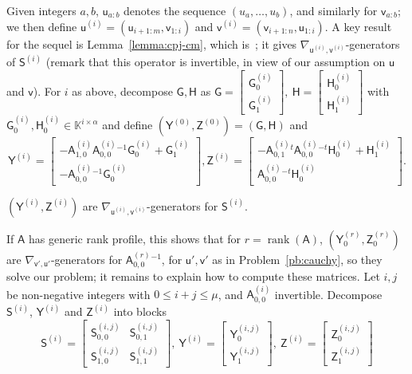 \documentclass[sigconf]{acmart}
\newcommand{\vu}{\ensuremath{\mathsf{u}}}
\newcommand{\vv}{\ensuremath{\mathsf{v}}}
\newcommand{\mA}{\ensuremath{\mathsf{A}}}
\newcommand{\mG}{\ensuremath{\mathsf{G}}}
\newcommand{\mH}{\ensuremath{\mathsf{H}}}
\newcommand{\mS}{\ensuremath{\mathsf{S}}}
\newcommand{\mY}{\ensuremath{\mathsf{Y}}}
\newcommand{\mZ}{\ensuremath{\mathsf{Z}}}
\newcommand{\K}{\ensuremath{\mathbb{K}}}
\newcommand{\mn}{\ensuremath{\mu}}
\newcommand{\rank}{\ensuremath{\operatorname{rank}}}
\theoremstyle{acmdefinition}
\begin{document}
Given integers $a,b$, $\vu_{a:b}$ denotes the sequence
$(u_a,\dots,u_b)$, and similarly for $\vv_{a:b}$; we then define
$\vu^{(i)}=(\vu_{i+1:m},\vv_{1:i})$ and
$\vv^{(i)}=(\vv_{i+1:n},\vu_{1:i})$.
A key result for the sequel is Lemma~\ref{lemma:cpj-cm}, which
is~\cite[Proposition~1]{Cardinal99}; it gives 
$\nabla_{\vu^{(i)},\vv^{(i)}}$-generators of $\mS^{(i)}$ (remark that
this operator is invertible, in view of our assumption on $\vu$ and
$\vv$).  For $i$ as above, decompose $\mG,\mH$ as
$
\mG=\left [\begin{smallmatrix} 
   \mG^{(i)}_0 \\ \mG^{(i)}_1
\end{smallmatrix}\right ],\ 
  \mH=
\left [\begin{smallmatrix}
        \mH^{(i)}_0 \\    \mH^{(i)}_1 
\end{smallmatrix}\right ]
$
with $\mG^{(i)}_0, \mH^{(i)}_0 \in \K^{i \times \alpha}$ and define
$(\mY^{(0)},\mZ^{(0)})=(\mG,\mH)$ and 
\[
\!\!\mY^{(i)}\!=\! 
\begin{bmatrix}
-\mA^{(i)}_{1,0}{\mA^{(i)}_{0,0}}{}^{-1}\mG^{(i)}_0 + \mG^{(i)}_1 \\
-{\mA^{(i)}_{0,0}}{}^{-1} \mG^{(i)}_0 
\end{bmatrix}\!,
\mZ^{(i)}\!=\! 
\begin{bmatrix}
-{\mA^{(i)}_{0,1}}{}^t{\mA^{(i)}_{0,0}}{}^{-t}\mH^{(i)}_0 + \mH^{(i)}_1 \\
{\mA^{(i)}_{0,0}}{}^{-t} \mH^{(i)}_0 
\end{bmatrix}.
\]
\begin{lemma}\label{lemma:cpj-cm}
 $(\mY^{(i)},\mZ^{(i)})$ are $\nabla_{\vu^{(i)},\vv^{(i)}}$-generators for $\mS^{(i)}$.
\end{lemma}
If $\mA$ has generic rank profile, this shows
that for $r=\rank(\mA)$, $(\mY^{(r)}_0,\mZ^{(r)}_0)$ are
$\nabla_{\vv',\vu'}$-generators for ${\mA^{(r)}_{0,0}}{}^{-1}$, for
$\vu',\vv'$ as in Problem~\ref{pb:cauchy}, so they solve our problem;
it remains to explain how to compute these matrices.
%
Let $i,j$ be non-negative integers with $0 \le i+j \le \mn$, and
${\mA^{(i)}_{0,0}}$ invertible. Decompose $\mS^{(i)}$, $\mY^{(i)}$ and
$\mZ^{(i)}$ into blocks
\begin{equation*}
\mS^{(i)} = \begin{bmatrix} 
\mS^{(i,j)}_{0,0} & \mS^{(i,j)}_{0,1} \\
\mS^{(i,j)}_{1,0} & \mS^{(i,j)}_{1,1}
\end{bmatrix},\  
\mY^{(i)} = 
\begin{bmatrix}
  \mY^{(i,j)}_0 \\\mY^{(i,j)}_1
\end{bmatrix},\ 
\mZ^{(i)} = 
\begin{bmatrix}
  \mZ^{(i,j)}_0 \\\mZ^{(i,j)}_1
\end{bmatrix}
\end{equation*}
\end{document}
